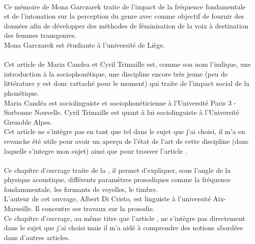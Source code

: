 \cite{Gar22}\\
      Ce mémoire de Mona Garczarek traite de l'impact de la fréquence fondamentale et de l'intonation sur la perception du genre avec comme objectif de fournir des données afin de développer des méthodes de féminisation de la voix à destination des femmes transgenres.\\
      Mona Garczarek est étudiante à l'université de Liège.\\

\cite{Can15} \\
      Cet article de Maria Candea et Cyril Trimaille est, comme son nom l'indique, une introduction à la sociophonétique, une discipline encore très jeune (peu de littérature y est donc rattaché pour le moment) qui traite de l'impact social de la phonétique.\\
      Maria Candéa est sociolinguiste et sociophonéticienne à l'Université Paris 3 - Sorbonne Nouvelle. Cyril Trimaille est quant à lui sociolinguiste à l'Université Grenoble Alpes.\\
      Cet article ne s'intègre pas en tant que tel dans le sujet que j'ai choisi, il m'a en revanche été utile pour avoir un aperçu de l'état de l'art de cette discipline (dans laquelle s'integre mon sujet) ainsi que pour trouver l'article \cite{Pep20}.\\
      
\cite{DiC13}\\
      Ce chapitre d'ouvrage traite de la , il permet d'expliquer, sous l'angle de la physique acoustique, différents paramètres prosodiques comme la fréquence fondammentale, les formants de voyelles, le timbre.\\
      L'auteur de cet ouvrage, Albert Di Cristo, est linguiste à l'université Aix-Marseille. Il concentre ses travaux sur la prosodie.\\
      Ce chapitre d'ouvrage, au même titre que l'article \cite{Can15}, ne s'intègre pas directement dans le sujet que j'ai choisi mais il m'a aidé à comprendre des notions abordées dans d'autres articles.\\

\printbibliography
